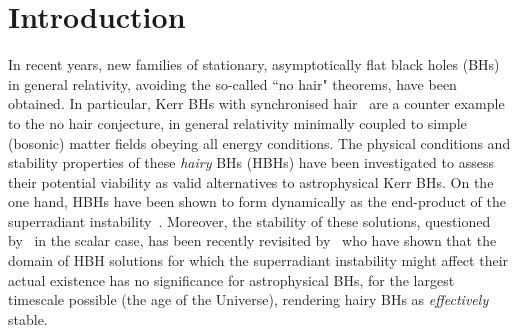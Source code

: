 \documentclass[twocolumn,aps,showpacs,showkeys,prd,superscriptaddress,byrevtex, amsmath]{revtex4-1}
\begin{document}

\section{Introduction}

In recent years, new families of stationary, asymptotically flat black holes (BHs) in general relativity, avoiding the so-called ``no hair" theorems, have been obtained. In particular, Kerr BHs with synchronised hair~\cite{Herdeiro:2014a,Herdeiro:2016} are a counter example to the no hair conjecture, in general relativity minimally coupled to simple (bosonic) matter fields obeying all energy conditions. The physical conditions and stability properties of these {\it hairy} BHs  (HBHs) have been investigated to assess their potential viability as valid alternatives to astrophysical Kerr BHs.  On the one hand, HBHs have been shown to form dynamically as the end-product of the superradiant instability~\cite{East:2017,Herdeiro:2017}. Moreover, the stability of these solutions, questioned by~\cite{Ganchev:2018} in the scalar case, has been recently revisited by~\cite{Degollado:2018} who have shown that the domain of HBH solutions for which the superradiant instability might affect their actual existence has no significance for astrophysical BHs, for the largest timescale possible (the age of the Universe), rendering hairy BHs as {\it effectively} stable.
\end{document}
